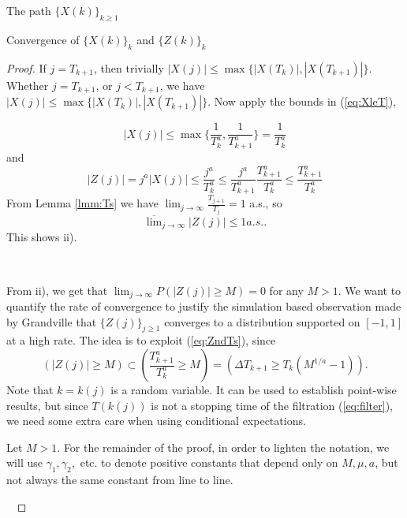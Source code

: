 \documentclass[12pt]{article}
\begin{document}
\begin{section}{The path $\{X(k)\}_{k\ge1}$ }
\begin{subsection}{Convergence of $\{X(k)\}_k$ and $\{Z(k)\}_k$}
\begin{proof}
If $j = T_{k+1}$, then trivially $|X(j)| \le \max \{|X(T_{k})|, |X(T_{k+1})|\}$. 
Whether $j=T_{k+1}$, or $j < T_{k+1}$, we have $|X(j)| \le \max \{|X(T_{k})|, |X(T_{k+1})|\}$. Now apply the bounds in (\ref{eq:XleT}), 

$$
|X(j)| \le 
\max \{ 
		\frac{1}{T_{k}^a} , 
		\frac{1}{T_{k+1}^a} \} 
		= \frac{1}{T_{k}^a} 
$$
and
\begin{equation} \label{eq:ZndTs}
|Z(j)| = j^a|X(j)| \le \frac{j^a}{T_{k}^a} \le \frac{j^a}{T_{k+1}^a} \frac{T_{k+1}^a}{T_{k}^a} \le \frac{T_{k+1}^a}{T_{k}^a}
\end{equation}
From Lemma \ref{lmm:Ts} we have $\lim_{j \rightarrow \infty} \frac{T_{j+1} }{T_j} = 1$ a.s., so
$$
\overline{ \lim}_{j \rightarrow \infty} |Z(j)| \le 1 a.s..
$$ This shows ii).

\   

From ii), we get that $ \lim_{j \rightarrow \infty } P(|Z(j)| \ge M) = 0 $ for any $M > 1$. We want to quantify the rate of convergence to justify the simulation based observation made by Grandville that $\{Z(j)\}_{j \ge 1}$ converges to a distribution supported on $[-1,1]$ at a high rate. The idea is to exploit (\ref{eq:ZndTs}), since 
$$
(|Z(j)| \ge M) \subset ( \frac{T_{k+1}^a}{T_{k}^a} \ge M) = 
 ( \Delta T_{k+1} \ge T_{k}(M^{1/a} -1) ).
$$
Note that $k=k(j)$ is a random variable. It can be used to establish point-wise results, but since $T(k(j))$ is not a stopping time of the filtration (\ref{eq:filter}), we need some extra care when using conditional expectations.

Let $M>1$. For the remainder of the proof, in order to lighten the notation, we will use $\gamma_1, \gamma_2,$ etc. to denote positive constants that depend only on $M, \mu, a$, but not always the same constant from line to line.  

\  


\end{proof}
\end{subsection}
\end{section}
\end{document}
